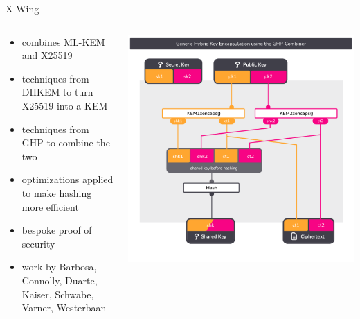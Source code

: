 \begin{frame}{X-Wing \citeXwing}
  \begin{columns}[c]
    \begin{column}{.4\linewidth}
      \small
      \begin{itemize}
        \item combines ML-KEM and X25519
        \item techniques from DHKEM to turn X25519 into a KEM
        \item techniques from GHP to combine the two
        \item optimizations applied to make hashing more efficient
        \item bespoke proof of security
        \item work by Barbosa, Connolly, Duarte, Kaiser, Schwabe, Varner, Westerbaan~\citeXwing
      \end{itemize}
    \end{column}
    \begin{column}{.55\linewidth}
      \includegraphics[width=\linewidth,page=3,clip=true,trim={29 43  29 58}]{graphics/rosenpass-encapsulation-combiner.pdf}
    \end{column}

  \end{columns}
\end{frame}

